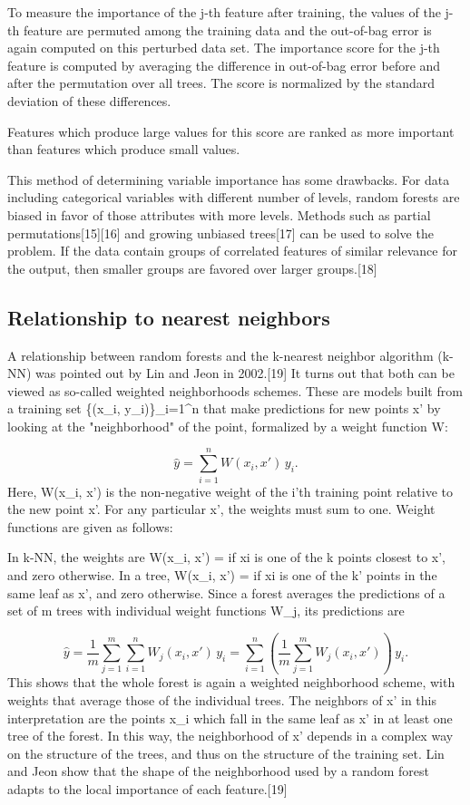 To measure the importance of the j-th feature after training, the values of the j-th feature are permuted among the training data and the out-of-bag error is again computed on this perturbed data set. The importance score for the j-th feature is computed by averaging the difference in out-of-bag error before and after the permutation over all trees. The score is normalized by the standard deviation of these differences.

Features which produce large values for this score are ranked as more important than features which produce small values.

This method of determining variable importance has some drawbacks. For data including categorical variables with different number of levels, random forests are biased in favor of those attributes with more levels. Methods such as partial permutations[15][16] and growing unbiased trees[17] can be used to solve the problem. If the data contain groups of correlated features of similar relevance for the output, then smaller groups are favored over larger groups.[18]

\subsection{Relationship to nearest neighbors}
A relationship between random forests and the k-nearest neighbor algorithm (k-NN) was pointed out by Lin and Jeon in 2002.[19] It turns out that both can be viewed as so-called weighted neighborhoods schemes. These are models built from a training set \{(x_i, y_i)\}_{i=1}^n that make predictions  for new points x' by looking at the "neighborhood" of the point, formalized by a weight function W:

\[\hat{y} = \sum_{i=1}^n W(x_i, x') \, y_i.\]
Here, W(x_i, x') is the non-negative weight of the i'th training point relative to the new point x'. For any particular x', the weights must sum to one. Weight functions are given as follows:

In k-NN, the weights are W(x_i, x') =  if xi is one of the k points closest to x', and zero otherwise.
In a tree, W(x_i, x') =  if xi is one of the k' points in the same leaf as x', and zero otherwise.
Since a forest averages the predictions of a set of m trees with individual weight functions W_j, its predictions are

\[\hat{y} = \frac{1}{m}\sum_{j=1}^m\sum_{i=1}^n W_{j}(x_i, x') \, y_i = \sum_{i=1}^n\left(\frac{1}{m}\sum_{j=1}^m W_{j}(x_i, x')\right) \, y_i.\]
This shows that the whole forest is again a weighted neighborhood scheme, with weights that average those of the individual trees. The neighbors of x' in this interpretation are the points x_i which fall in the same leaf as x' in at least one tree of the forest. In this way, the neighborhood of x' depends in a complex way on the structure of the trees, and thus on the structure of the training set. Lin and Jeon show that the shape of the neighborhood used by a random forest adapts to the local importance of each feature.[19]

